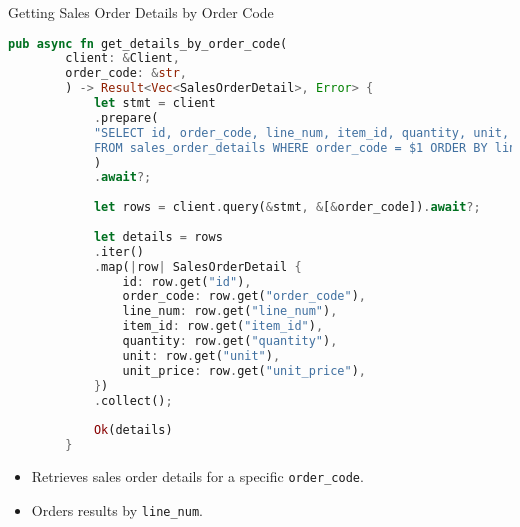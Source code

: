 \documentclass[aspectratio=169, table]{beamer}
\begin{document}
\begin{frame}[fragile]{Getting Sales Order Details by Order Code}
	\begin{lstlisting}[language=Rust]
		pub async fn get_details_by_order_code(
		client: &Client,
		order_code: &str,
		) -> Result<Vec<SalesOrderDetail>, Error> {
			let stmt = client
			.prepare(
			"SELECT id, order_code, line_num, item_id, quantity, unit, unit_price
			FROM sales_order_details WHERE order_code = $1 ORDER BY line_num",
			)
			.await?;
			
			let rows = client.query(&stmt, &[&order_code]).await?;
			
			let details = rows
			.iter()
			.map(|row| SalesOrderDetail {
				id: row.get("id"),
				order_code: row.get("order_code"),
				line_num: row.get("line_num"),
				item_id: row.get("item_id"),
				quantity: row.get("quantity"),
				unit: row.get("unit"),
				unit_price: row.get("unit_price"),
			})
			.collect();
			
			Ok(details)
		}
	\end{lstlisting}
	\begin{itemize}
		\item Retrieves sales order details for a specific \texttt{order\_code}.
		\item Orders results by \texttt{line\_num}.
	\end{itemize}
\end{frame}
\end{document}
